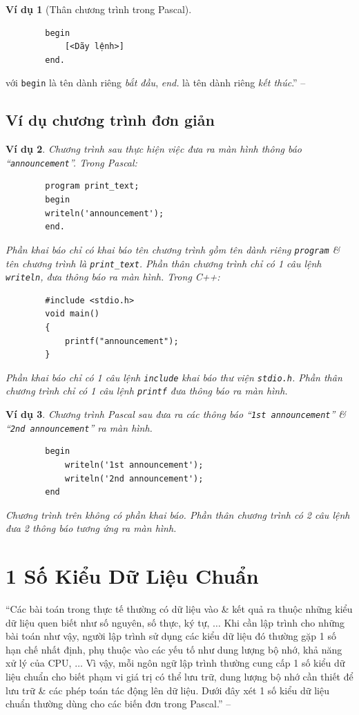 \documentclass[oneside]{book}
\numberwithin{equation}{section}
\newtheorem{vidu}{Ví dụ}[section]
\begin{document}
\begin{vidu}[Thân chương trình trong Pascal]
	\begin{verbatim}
		begin
		    [<Dãy lệnh>]
		end.
	\end{verbatim}
\end{vidu}
với \texttt{begin} là tên dành riêng \textit{bắt đầu}, \textit{end.} là tên dành riêng \textit{kết thúc}.'' -- \cite[p. 19]{SGK_Tin_Hoc_11}

\subsection{Ví dụ chương trình đơn giản}

\begin{vidu}
	Chương trình sau thực hiện việc đưa ra màn hình thông báo ``\texttt{announcement}''. Trong Pascal:
	\begin{verbatim}
		program print_text;
		begin
		writeln('announcement');
		end.
	\end{verbatim}
	Phần khai báo chỉ có khai báo tên chương trình gồm tên dành riêng \texttt{program} \& tên chương trình là \verb|print_text|. Phần thân chương trình chỉ có 1 câu lệnh \texttt{writeln}, đưa thông báo ra màn hình. Trong C++:
	\begin{verbatim}
		#include <stdio.h>
		void main()
		{
			printf("announcement");
		}
	\end{verbatim}
	Phần khai báo chỉ có 1 câu lệnh \texttt{include} khai báo thư viện \texttt{stdio.h}. Phần thân chương trình chỉ có 1 câu lệnh \texttt{printf} đưa thông báo ra màn hình.	
\end{vidu}

\begin{vidu}
	Chương trình Pascal sau đưa ra các thông báo ``\texttt{1st announcement}'' \& ``\texttt{2nd announcement}'' ra màn hình.
	\begin{verbatim}
		begin
		    writeln('1st announcement');
		    writeln('2nd announcement');
		end
	\end{verbatim}
	Chương trình trên không có phần khai báo. Phần thân chương trình có 2 câu lệnh đưa 2 thông báo tương ứng ra màn hình.
\end{vidu}


\section{1 Số Kiểu Dữ Liệu Chuẩn}
``Các bài toán trong thực tế thường có dữ liệu vào \& kết quả ra thuộc những kiểu dữ liệu quen biết như số nguyên, số thực, ký tự, $\ldots$ Khi cần lập trình cho những bài toán như vậy, người lập trình sử dụng các kiểu dữ liệu đó thường gặp 1 số hạn chế nhất định, phụ thuộc vào các yếu tố như dung lượng bộ nhớ, khả năng xử lý của CPU, $\ldots$ Vì vậy, mỗi ngôn ngữ lập trình thường cung cấp 1 số kiểu dữ liệu chuẩn cho biết phạm vi giá trị có thể lưu trữ, dung lượng bộ nhớ cần thiết để lưu trữ \& các phép toán tác động lên dữ liệu. Dưới đây xét 1 số kiểu dữ liệu chuẩn thường dùng cho các biến đơn trong Pascal.'' -- \cite[p. 21]{SGK_Tin_Hoc_11}
\end{document}
